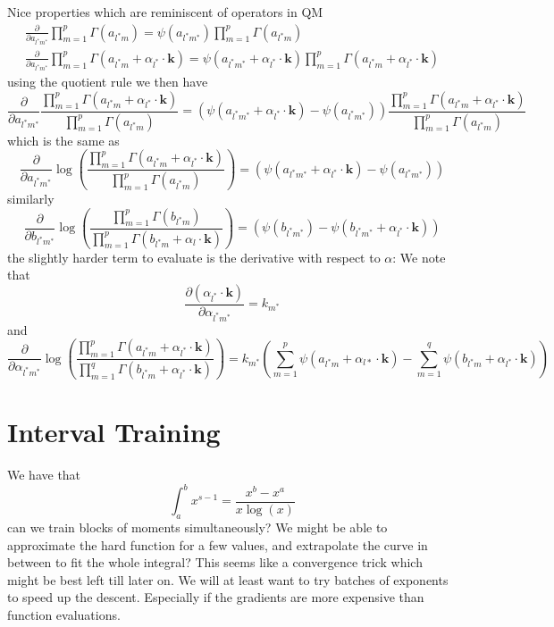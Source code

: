 \documentclass[journal=jcisd8,manuscript=article,layout=onecolumn,pdftex,floatfix,amsmath,amssymb,10pt]{achemso}
\begin{document}
Nice properties which are reminiscent of operators in QM
\begin{align}
\frac{\partial}{\partial a_{l^*m^*}} \prod_{m=1}^p \Gamma(a_{l^* m}) = \psi(a_{l^*m^*})\prod_{m=1}^p \Gamma(a_{l^* m}) \\
\frac{\partial}{\partial a_{l^*m^*}} \prod_{m=1}^p \Gamma(a_{l^* m} + \alpha_{l^*} \cdot \mathbf{k}) = \psi(a_{l^*m^*} + \alpha_{l^*}\cdot \mathbf{k})\prod_{m=1}^p \Gamma(a_{l^* m} + \alpha_{l^*}\cdot \mathbf{k})
\end{align}
using the quotient rule we then have
\begin{equation}
\frac{\partial}{\partial a_{l^*m^*}} \frac{\prod_{m=1}^p \Gamma(a_{l^* m} + \alpha_{l^*} \cdot \mathbf{k})}{\prod_{m=1}^p \Gamma(a_{l^* m})} =(\psi(a_{l^*m^*}+\alpha_{l^*} \cdot \mathbf{k})-\psi(a_{l^*m^*}))\frac{\prod_{m=1}^p \Gamma(a_{l^* m} + \alpha_{l^*} \cdot \mathbf{k})}{\prod_{m=1}^p \Gamma(a_{l^* m})}
\end{equation}
which is the same as
\begin{equation}
\frac{\partial}{\partial a_{l^*m^*}} \log\left( \frac{\prod_{m=1}^p \Gamma(a_{l^* m} + \alpha_{l^*} \cdot \mathbf{k})}{\prod_{m=1}^p \Gamma(a_{l^* m})}\right) =(\psi(a_{l^*m^*}+\alpha_{l^*} \cdot \mathbf{k})-\psi(a_{l^*m^*}))
\end{equation}
similarly
\begin{equation}
\frac{\partial}{\partial b_{l^*m^*}} \log\left( \frac{\prod_{m=1}^p \Gamma(b_{l^* m})}{\prod_{m=1}^p \Gamma(b_{l^* m} + \alpha_l \cdot \mathbf{k})}\right) =(\psi(b_{l^*m^*})-\psi(b_{l^*m^*}+\alpha_{l^*} \cdot \mathbf{k}))
\end{equation}
the slightly harder term to evaluate is the derivative with respect to $\alpha$: We note that 
\begin{equation}
\frac{\partial (\alpha_{l^*} \cdot \mathbf{k}) }{\partial \alpha_{l^*m^*}}= k_{m^*}
\end{equation}
and \begin{equation}
\frac{\partial}{\partial \alpha_{l^*m^*}} \log \left(\frac{\prod_{m=1}^p \Gamma(a_{l^* m} + \alpha_{l^*} \cdot \mathbf{k})}{\prod_{m=1}^q \Gamma(b_{l^*m} + \alpha_{l^*} \cdot \mathbf{k})} \right) = k_{m^*}\left(\sum_{m=1}^p \psi(a_{l^*m} + \alpha_{l*}\cdot \mathbf{k}) - \sum_{m=1}^q \psi(b_{l^*m}+\alpha_{l^*}\cdot \mathbf{k})\right)
\end{equation}

\section{Interval Training}
We have that
\begin{equation}
\int_a^b x^{s-1} = \frac{x^b-x^a}{x \log(x)}
\end{equation}
can we train blocks of moments simultaneously? We might be able to approximate the hard function for a few values, and extrapolate the curve in between to fit the whole integral? This seems like a convergence trick which might be best left till later on. We will at least want to try batches of exponents to speed up the descent. Especially if the gradients are more expensive than function evaluations.
\end{document}
